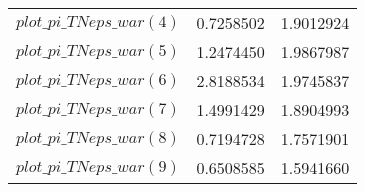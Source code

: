 \begin{center}
\begin{longtable}{lcc}
$plot\_pi\_TN eps\_war (4)   $	 & 	      0.7258502	 & 	      1.9012924 \\ 
$plot\_pi\_TN eps\_war (5)   $	 & 	      1.2474450	 & 	      1.9867987 \\ 
$plot\_pi\_TN eps\_war (6)   $	 & 	      2.8188534	 & 	      1.9745837 \\ 
$plot\_pi\_TN eps\_war (7)   $	 & 	      1.4991429	 & 	      1.8904993 \\ 
$plot\_pi\_TN eps\_war (8)   $	 & 	      0.7194728	 & 	      1.7571901 \\ 
$plot\_pi\_TN eps\_war (9)   $	 & 	      0.6508585	 & 	      1.5941660 \\ 
\end{longtable}
 \end{center}
